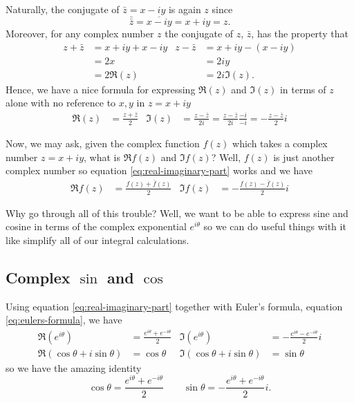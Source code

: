 \documentclass{amsart}
\theoremstyle{plain}
\theoremstyle{definition}
\begin{document}
Naturally, the conjugate of $\bar z=x-iy$ is again $z$ since
\begin{equation}
\label{eq:double-conjugate}
\bar{\bar z}=\overline{x-iy}=x+iy=z.
\end{equation}
Moreover, for any complex number $z$ the conjugate of $z$, $\bar z$, has
the property that
\begin{align*}
z+\bar z&= x+iy+x-iy&
z-\bar z&=x+iy-(x-iy)\\
        &=2x
        &&=2iy\\
        &=2\Re(z)
        &&=2i\Im(z).
\end{align*}
Hence, we have a nice formula for expressing $\Re(z)$ and $\Im(z)$ in terms
of $z$ alone with no reference to $x,y$ in $z=x+iy$
\begin{align}
  \label{eq:real-imaginary-part}
\Re(z)&=\frac{z+\bar z}{2}&
\Im(z)&=\frac{z-\bar z}{2i}=\frac{z-\bar z}{2i}\frac{-i}{-i}=-\frac{z-\bar z}{2}i
\end{align}

Now, we may ask, given the complex function $f(z)$ which takes a complex
number $z=x+iy$, what is $\Re f(z)$ and $\Im f(z)$? Well, $f(z)$ is just
another complex number so equation \eqref{eq:real-imaginary-part} works
and we have
\begin{align*}
\Re f(z)&=\frac{f(z)+\bar f(z)}{2}&
\Im f(z)&=-\frac{f(z)-\bar f(z)}{2}i
\end{align*}

Why go through all of this trouble? Well, we want to be able to express
sine and cosine in terms of the complex exponential $e^{i\theta}$ so we can
do useful things with it like simplify all of our integral calculations.

\subsection{Complex $\sin$ and $\cos$}
Using equation \eqref{eq:real-imaginary-part} together with Euler's
formula, equation \eqref{eq:eulers-formula}, we have
\begin{align*}
\Re\left(e^{i\theta}\right)&=\frac{e^{i\theta}+e^{-i\theta}}{2}&
\Im\left(e^{i\theta}\right)&=-\frac{e^{i\theta}-e^{-i\theta}}{2}i\nonumber\\
\Re(\cos\theta+i\sin\theta)&=\cos\theta&
\Im(\cos\theta+i\sin\theta)&=\sin\theta
\end{align*}
so we have the amazing identity
\begin{equation}
\label{eq:complex-sin-cos}
\cos\theta=\frac{e^{i\theta}+e^{-i\theta}}{2}
\qquad
\sin\theta=-\frac{e^{i\theta}+e^{-i\theta}}{2}i.
\end{equation}
\end{document}
